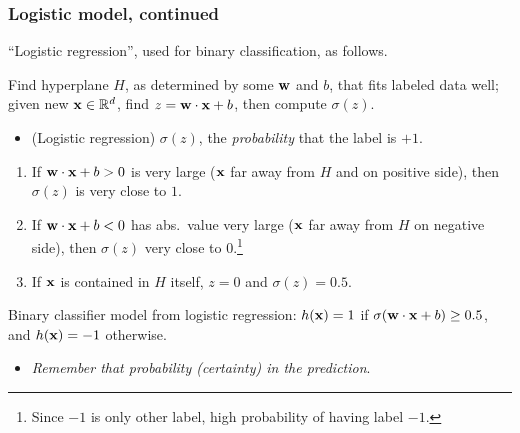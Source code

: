 \documentclass{beamer}
\theoremstyle{example}
\begin{document}
\begin{frame}
\frametitle{Logistic model, continued}
    ``Logistic regression'', used for binary classification, as follows.
    
    Find hyperplane $H$, as determined by some ${\bf w}$ and $b$, that fits labeled data well; given new ${\bf x}\in\mathbb R^d$, find $z = {\bf w}\cdot{\bf x}+b$, then compute $\sigma(z)$. 
    \pause
    \begin{itemize}
        \item (Logistic regression) $\sigma(z)$, the \textit{probability} that the label is $+1$.
    \end{itemize}
    
    \pause
    \begin{enumerate}
        \item If ${\bf w}\cdot{\bf x}+b > 0$ is very large (${\bf x}$ far away from $H$ and on positive side), then  $\sigma(z)$ is very close to $1$.
        \pause
        \item If ${\bf w}\cdot{\bf x}+b < 0$ has abs.\ value very large (${\bf x}$ far away from $H$ on negative side), then  $\sigma(z)$ very close to $0$.\footnote{Since $-1$ is only other label, high probability of having label $-1$.}
        \pause
        \item If ${\bf x}$ is contained in $H$ itself, $z=0$ and $\sigma(z) = 0.5$.
    \end{enumerate}
    \pause
    Binary classifier model from logistic regression: $h({\bf x})=1$ if $\sigma({\bf w}\cdot{\bf x}+b) \ge 0.5$, and $h({\bf x})=-1$ otherwise. 
    \begin{itemize}
        \item \textit{Remember that probability (certainty) in the prediction}.
    \end{itemize}

\end{frame}
\end{document}
